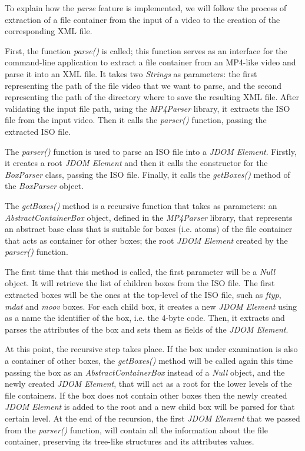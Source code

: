 To explain how the \emph{parse} feature is implemented, we will follow the process of extraction of a file container from the input of a video to the creation of the corresponding XML file.

First, the function \emph{parse()} is called; this function serves as an interface for the command-line application to extract a file container from an MP4-like video and parse it into an XML file. It takes two \emph{Strings} as parameters: the first representing the path of the file video that we want to parse, and the second representing the path of the directory where to save the resulting XML file. After validating the input file path, using the \emph{MP4Parser} library, it extracts the ISO file from the input video. Then it calls the \emph{parser()} function, passing the extracted ISO file.

The \emph{parser()} function is used to parse an ISO file into a \emph{JDOM Element}. Firstly, it creates a root \emph{JDOM Element} and then it calls the constructor for the \emph{BoxParser} class, passing the ISO file. Finally, it calls the \emph{getBoxes()} method of the \emph{BoxParser} object.

The \emph{getBoxes()} method is a recursive function that takes as parameters: an \emph{AbstractContainerBox} object, defined in the \emph{MP4Parser} library, that represents an abstract base class that is suitable for boxes (i.e. atoms) of the file container that acts as container for other boxes; the root \emph{JDOM Element} created by the \emph{parser()} function.

The first time that this method is called, the first parameter will be a \emph{Null} object. It will retrieve the list of children boxes from the ISO file. The first extracted boxes will be the ones at the top-level of the ISO file, such as \emph{ftyp}, \emph{mdat} and \emph{moov} boxes.
For each child box, it creates a new \emph{JDOM Element} using as a name the identifier of the box, i.e. the 4-byte code. Then, it extracts and parses the attributes of the box and sets them as fields of the \emph{JDOM Element}.

At this point, the recursive step takes place. If the box under examination is also a container of other boxes, the \emph{getBoxes()} method will be called again this time passing the box as an \emph{AbstractContainerBox} instead of a \emph{Null} object, and the newly created \emph{JDOM Element}, that will act as a root for the lower levels of the file containers. If the box does not contain other boxes then the newly created \emph{JDOM Element} is added to the root and a new child box will be parsed for that certain level.
At the end of the recursion, the first \emph{JDOM Element} that we passed from the \emph{parser()} function, will contain all the information about the file container, preserving its tree-like structures and its attributes values.

